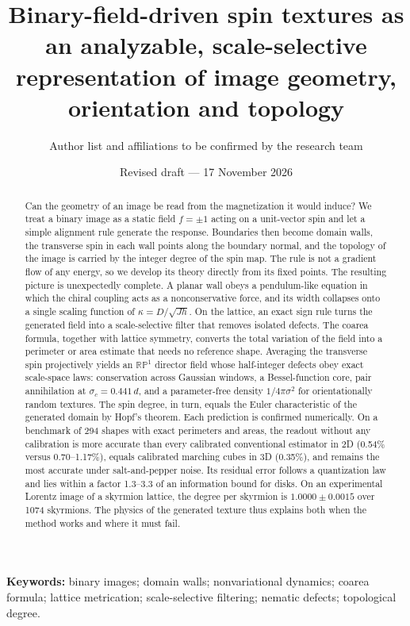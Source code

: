 \documentclass[11pt,a4paper]{article}
\title{Binary-field-driven spin textures as an analyzable, scale-selective representation of image geometry, orientation and topology}
\author{Author list and affiliations to be confirmed by the research team}
\date{Revised draft --- 17 November 2026}
\newcommand{\RP}{\mathbb{RP}}
\begin{document}
\maketitle

\begin{abstract}
Can the geometry of an image be read from the magnetization it would induce? We treat a binary image as a static field $f=\pm1$ acting on a unit-vector spin and let a simple alignment rule generate the response. Boundaries then become domain walls, the transverse spin in each wall points along the boundary normal, and the topology of the image is carried by the integer degree of the spin map. The rule is not a gradient flow of any energy, so we develop its theory directly from its fixed points. The resulting picture is unexpectedly complete. A planar wall obeys a pendulum-like equation in which the chiral coupling acts as a nonconservative force, and its width collapses onto a single scaling function of $\kappa=D/\sqrt{Jh}$. On the lattice, an exact sign rule turns the generated field into a scale-selective filter that removes isolated defects. The coarea formula, together with lattice symmetry, converts the total variation of the field into a perimeter or area estimate that needs no reference shape. Averaging the transverse spin projectively yields an $\RP^1$ director field whose half-integer defects obey exact scale-space laws: conservation across Gaussian windows, a Bessel-function core, pair annihilation at $\sigma_c=0.441\,d$, and a parameter-free density $1/4\pi\sigma^2$ for orientationally random textures. The spin degree, in turn, equals the Euler characteristic of the generated domain by Hopf's theorem. Each prediction is confirmed numerically. On a benchmark of 294 shapes with exact perimeters and areas, the readout without any calibration is more accurate than every calibrated conventional estimator in 2D (0.54\% versus 0.70--1.17\%), equals calibrated marching cubes in 3D (0.35\%), and remains the most accurate under salt-and-pepper noise. Its residual error follows a quantization law and lies within a factor 1.3--3.3 of an information bound for disks. On an experimental Lorentz image of a skyrmion lattice, the degree per skyrmion is $1.0000\pm0.0015$ over 1074 skyrmions. The physics of the generated texture thus explains both when the method works and where it must fail.
\end{abstract}

\noindent\textbf{Keywords:} binary images; domain walls; nonvariational dynamics; coarea formula; lattice metrication; scale-selective filtering; nematic defects; topological degree.
\end{document}
